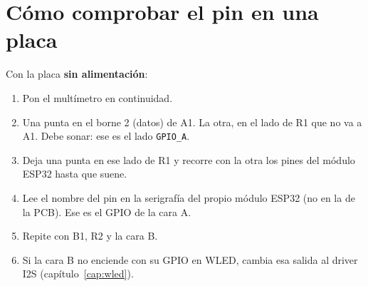 \section{Cómo comprobar el pin en una placa}\label{sec:comprobar-pin}

Con la placa \textbf{sin alimentación}:
\begin{enumerate}
\item Pon el multímetro en continuidad.
\item Una punta en el borne 2 (datos) de A1. La otra, en el lado de R1 que no va a A1. Debe sonar: ese es el lado \texttt{GPIO\_A}.
\item Deja una punta en ese lado de R1 y recorre con la otra los pines del módulo ESP32 hasta que suene.
\item Lee el nombre del pin en la serigrafía del propio módulo ESP32 (no en la de la PCB). Ese es el GPIO de la cara A.
\item Repite con B1, R2 y la cara B.
\item Si la cara B no enciende con su GPIO en WLED, cambia esa salida al driver I2S (capítulo~\ref{cap:wled}).
\end{enumerate}

